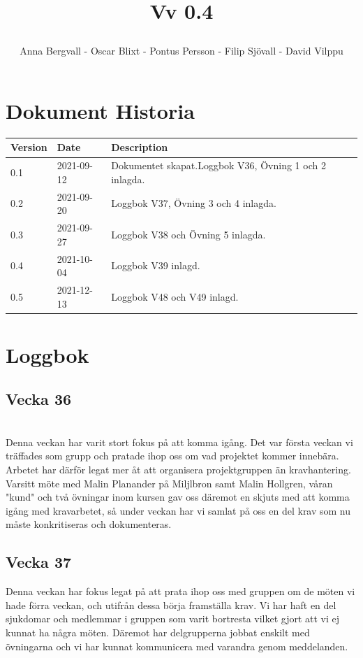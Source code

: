 \documentclass[12pt]{article}
\date {#1}
\title {
    \documentNumber {01}    

    \documentTitle {Helsingborg Event and Convention Bureau}
    
    \documentDate {2021-08-20}
    \documentVersion Vv 0.4
    
    \author{Anna Bergvall - Oscar Blixt - Pontus Persson - Filip Sjövall - David Vilppu}
}
\begin{document}
\maketitle

\thispagestyle{empty}



\newpage

\tableofcontents


\newpage

\section{Dokument Historia}
\begin{tabular}{ l | l | l }
    Version & Date & Description \\
    \hline
    0.1 & 2021-09-12 & Dokumentet skapat.Loggbok V36, Övning 1 och 2 inlagda. \\
    \hline
    0.2 & 2021-09-20 & Loggbok V37, Övning 3 och 4 inlagda.
    \\
    \hline
    0.3 & 2021-09-27 & Loggbok V38 och Övning 5 inlagda.
    \\
    \hline
    0.4 & 2021-10-04 & Loggbok V39 inlagd.
     \\
    \hline
    0.5 & 2021-12-13 & Loggbok V48 och V49 inlagd.
    \\
\end{tabular}

\newpage

\section{Loggbok}
    \subsection{Vecka 36}
    \\
    Denna veckan har varit stort fokus på att komma igång. Det var första veckan vi träffades som grupp och pratade ihop oss om vad projektet kommer innebära. Arbetet har därför legat mer åt att organisera projektgruppen än kravhantering. \\ Varsitt möte med Malin Planander på Miljlbron samt Malin Hollgren, våran "kund" och två övningar inom kursen gav oss däremot en skjuts med att komma igång med kravarbetet, så under veckan har vi samlat på oss en del krav som nu måste konkritiseras och dokumenteras. 
    
    \subsection{Vecka 37}
    Denna veckan har fokus legat på att prata ihop oss med gruppen om de möten vi hade förra veckan, och utifrån dessa börja framställa krav. Vi har haft en del sjukdomar och medlemmar i gruppen som varit bortresta vilket gjort att vi ej kunnat ha några möten. Däremot har delgrupperna jobbat enskilt med övningarna och vi har kunnat kommunicera med varandra genom meddelanden.
    
\end{document}
